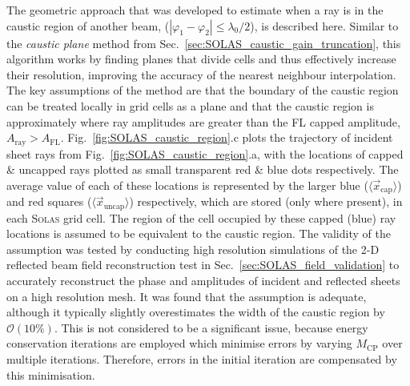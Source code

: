 The geometric approach that was developed to estimate when a ray is in the caustic region of another beam, ($|\varphi_1-\varphi_2|\leq\lambda_0/2$), is described here.
Similar to the \textit{caustic plane} method from Sec.~\ref{sec:SOLAS_caustic_gain_truncation}, this algorithm works by finding planes that divide cells and thus effectively increase their resolution, improving the accuracy of the nearest neighbour interpolation.
The key assumptions of the method are that the boundary of the caustic region can be treated locally in grid cells as a plane and that the caustic region is approximately where ray amplitudes are greater than the \ac{FL} capped amplitude, $A_{\text{ray}}>A_{\text{FL}}$.
Fig.~\ref{fig:SOLAS_caustic_region}.c plots the trajectory of incident sheet rays from Fig.~\ref{fig:SOLAS_caustic_region}.a, with the locations of capped \& uncapped rays plotted as small transparent red \& blue dots respectively.
The average value of each of these locations is represented by the larger blue ($\langle\vec{x}_{\text{cap}}\rangle$) and red squares ($\langle\vec{x}_{\text{uncap}}\rangle$) respectively, which are stored (only where present), in each \textsc{Solas} grid cell.
The region of the cell occupied by these capped (blue) ray locations is assumed to be equivalent to the caustic region.
The validity of the assumption was tested by conducting high resolution simulations of the 2-D reflected beam field reconstruction test in Sec.~\ref{sec:SOLAS_field_validation} to accurately reconstruct the phase and amplitudes of incident and reflected sheets on a high resolution mesh.
It was found that the assumption is adequate, although it typically slightly overestimates the width of the caustic region by $\mathcal{O}(10 \%)$.
This is not considered to be a significant issue, because energy conservation iterations are employed which minimise errors by varying $M_{\text{CP}}$ over multiple iterations.
Therefore, errors in the initial iteration are compensated by this minimisation.

